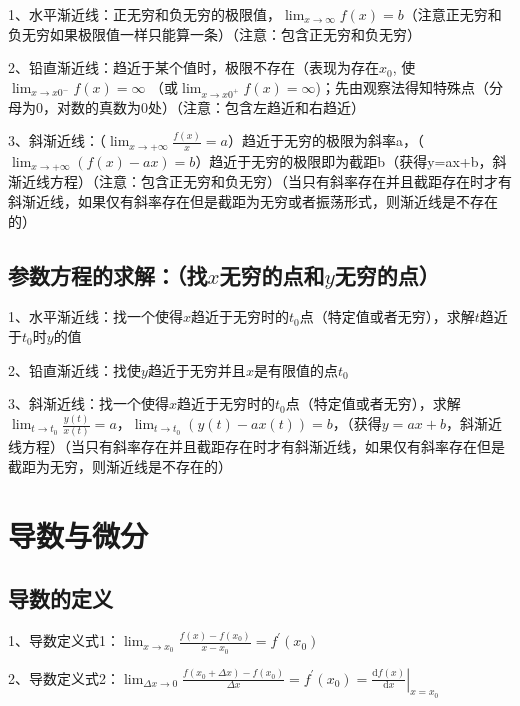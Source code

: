 1、水平渐近线：正无穷和负无穷的极限值，$\lim _{x \rightarrow \infty} f(x)=b$（注意正无穷和负无穷如果极限值一样只能算一条）（注意：包含正无穷和负无穷）

2、铅直渐近线：趋近于某个值时，极限不存在（表现为存在$x_{0}$,  使$\lim_{x \rightarrow x{0}^{-}} f(x)=\infty$ （或$\lim_{x \rightarrow x{0}^{+}} f(x)=\infty$)；先由观察法得知特殊点（分母为0，对数的真数为0处）（注意：包含左趋近和右趋近）

3、斜渐近线：（$\lim _{x \rightarrow+\infty} \frac{f(x)}{x}=a$）趋近于无穷的极限为斜率a，（$\lim _{x \rightarrow+\infty} ({f(x)}-{ax})=b$）趋近于无穷的极限即为截距b（获得y=ax+b，斜渐近线方程）（注意：包含正无穷和负无穷）（当只有斜率存在并且截距存在时才有斜渐近线，如果仅有斜率存在但是截距为无穷或者振荡形式，则渐近线是不存在的）



\subsection{参数方程的求解：（找$x$无穷的点和$y$无穷的点）}

1、水平渐近线：找一个使得$x$趋近于无穷时的$t_0$点（特定值或者无穷），求解$t$趋近于$t_0$时$y$的值

2、铅直渐近线：找使$y$趋近于无穷并且$x$是有限值的点$t_0$

3、斜渐近线：找一个使得$x$趋近于无穷时的$t_0$点（特定值或者无穷），求解$\lim _{t \rightarrow t_0} \frac{y(t)}{x(t)}=a$，$\lim _{t \rightarrow t_0} ({y(t)}-{ax(t)})=b$，（获得$y=ax+b$，斜渐近线方程）（当只有斜率存在并且截距存在时才有斜渐近线，如果仅有斜率存在但是截距为无穷，则渐近线是不存在的）

\section{导数与微分}



\subsection{导数的定义}

1、导数定义式1：$\lim _{x \rightarrow x_{0}} \frac{f(x)-f\left(x_{0}\right)}{x-x_{0}}=f^{\prime}\left(x_{0}\right)$

2、导数定义式2：$\lim _{\Delta x \rightarrow 0} \frac{f\left(x_{0}+\Delta x\right)-f\left(x_{0}\right)}{\Delta x}=f^{\prime}\left(x_{0}\right)=\left.\frac{\mathrm{d} f(x)}{\mathrm{d} x}\right|_{x=x_{0}}$

